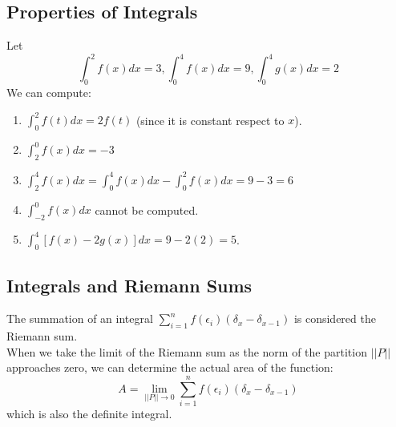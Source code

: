 \documentclass{article}
\begin{document}
\subsection{Properties of Integrals}
Let $$\int_{0}^{2} f(x)dx = 3,  \int_{0}^{4}f(x)dx = 9,  \int_{0}^{4}g(x)dx=2$$
We can compute:
\begin{enumerate}
    \item $\int_{0}^{2}f(t)dx = 2f(t)$ (since it is constant respect to $x$).
    \item $\int_{2}^{0}f(x)dx = -3$
    \item $\int_{2}^{4}f(x)dx = \int_{0}^{4}f(x)dx -\int_{0}^{2} f(x)dx = 9 - 3 = 6$
    \item $\int_{-2}^{0}f(x)dx $ cannot be computed.
    \item $\int_{0}^{4}[f(x) - 2g(x)]dx = 9 - 2(2) = 5$.
\end{enumerate}

\subsection{Integrals and Riemann Sums}
The summation of an integral $\sum_{i=1}^n f(\epsilon_i)(\delta_x - \delta_{x-1})$ is considered the Riemann sum.\\
When we take the limit of the Riemann sum as the norm of the partition $||P||$ approaches zero, we can determine the actual area of the function:
$$A = \lim_{||P|| \to 0} \sum_{i=1}^{n} f(\epsilon_i)(\delta_x - \delta_{x-1})$$
which is also the definite integral.
\end{document}
